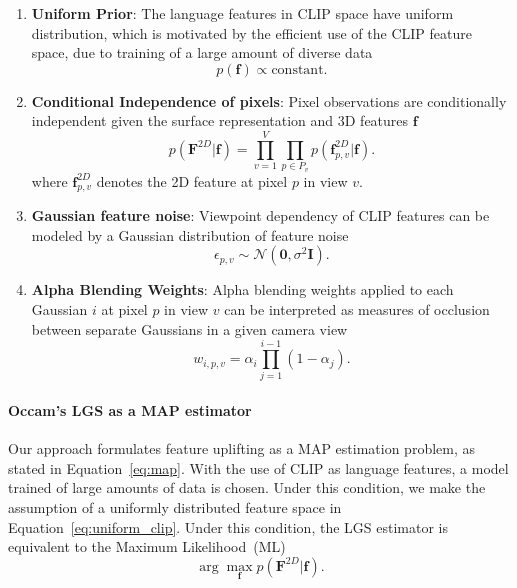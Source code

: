 \begin{enumerate}[label=(\roman*)]
    \item \textbf{Uniform Prior}: The language features in CLIP space have uniform distribution, which is motivated by the efficient use of the CLIP feature space, due to training of a large amount of diverse data
    \begin{equation}
        p(\mathbf{f}) \propto \text{constant}.
        \label{eq:uniform_clip}
    \end{equation}
    
    \item \textbf{Conditional Independence of pixels}: Pixel observations are conditionally independent given the surface representation and 3D features $\mathbf{f}$
    \begin{equation}
        p(\mathbf{F}^{2D}|\mathbf{f}) = \prod_{v=1}^V \prod_{p \in P_v} p(\mathbf{f}_{p,v}^{2D}|\mathbf{f}).
        \label{eq:cond_ind}
    \end{equation}
    where $\mathbf{f}_{p,v}^{2D}$ denotes the 2D feature at pixel $p$ in view $v$.
    
    \item \textbf{Gaussian feature noise}: Viewpoint dependency of CLIP features can be modeled by a Gaussian distribution of feature noise
    \begin{equation}
        \epsilon_{p,v} \sim \mathcal{N}(\mathbf{0}, \sigma^2\mathbf{I}).
    \end{equation}
    
    \item \textbf{Alpha Blending Weights}: Alpha blending weights applied to each Gaussian $i$ at pixel $p$ in view $v$ can be interpreted as measures of occlusion between separate Gaussians in a given camera view
    \begin{equation}
        w_{i,p,v} = \alpha_i \prod_{j=1}^{i-1}(1-\alpha_j).
        \label{eq:alpha_blending}
    \end{equation}    
\end{enumerate}

\paragraph{Occam's LGS as a MAP estimator}
Our approach formulates feature uplifting as a MAP estimation problem, as stated in Equation~\ref{eq:map}. With the use of CLIP as language features, a model trained of large amounts of data is chosen. Under this condition, we make the assumption of a uniformly distributed feature space in Equation~\ref{eq:uniform_clip}. Under this condition, the LGS estimator is equivalent to the Maximum Likelihood~(ML)
\begin{equation}
    \arg\max_\mathbf{f} p(\mathbf{F}^{2D}|\mathbf{f}).
\end{equation}

